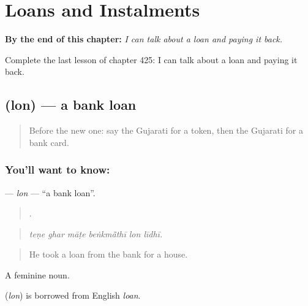 
\chapter{Loans and Instalments}
\label{ch:gu-loans-and-instalments}

\begin{chapteropening}
\textbf{By the end of this chapter:} \emph{I can talk about a loan and paying it back.}

Complete the last lesson of chapter 425: I can talk about a loan and paying it back.
\end{chapteropening}

\section[\texorpdfstring{\gu{લોન} (lon)}{લોન (lon)}]{ (lon) — a bank loan}

\label{lesson:GU-C425-lon}



\begin{quote}
Before the new one: say the Gujarati for a token, then the Gujarati for a bank card.
\end{quote}

\subsection*{You'll want to know: }
\textbf{} — \emph{lon} — \textquotedblleft{}a bank loan\textquotedblright{}.

\begin{quote}
     .
\end{quote}

\begin{quote}
\emph{teṇe ghar māṭe beṅkmā̃thī lon līdhī.}
\end{quote}

\begin{quote}
He took a loan from the bank for a house.
\end{quote}

A feminine noun.

\begin{cousinweb}
\textbf{} (\emph{lon}) is borrowed from English \emph{loan}.
\end{cousinweb}


